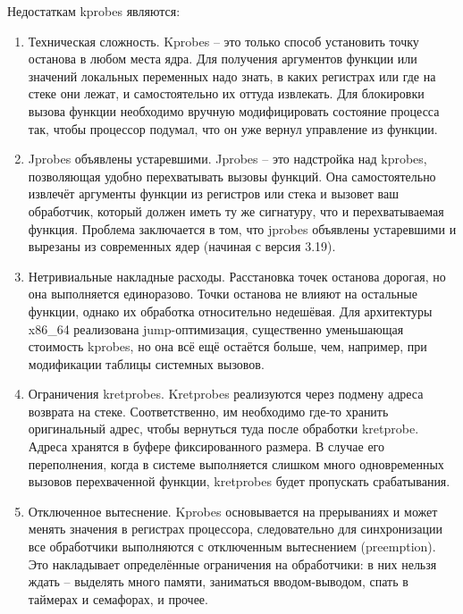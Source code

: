 		Недостаткам kprobes являются:
		\begin{enumerate}
			\item Техническая сложность. 
				Kprobes -- это только способ установить точку останова в любом места ядра. 
				Для получения аргументов функции или значений локальных переменных надо знать,
				в каких регистрах или где на стеке они лежат, и самостоятельно их оттуда извлекать.
				Для блокировки вызова функции необходимо вручную модифицировать состояние процесса так,
				чтобы процессор подумал, что он уже вернул управление из функции.

			\item Jprobes объявлены устаревшими. 
				Jprobes -- это надстройка над kprobes, позволяющая удобно перехватывать вызовы функций.
				Она самостоятельно извлечёт аргументы функции из регистров или стека и вызовет ваш обработчик,
				который должен иметь ту же сигнатуру, что и перехватываемая функция. 
				Проблема заключается в том, что jprobes объявлены устаревшими и вырезаны из современных ядер
				(начиная с версия 3.19).

			\item Нетривиальные накладные расходы. 
				Расстановка точек останова дорогая, но она выполняется единоразово. 
				Точки останова не влияют на остальные функции, однако их обработка относительно недешёвая.
				Для архитектуры x86\_64 реализована jump-оптимизация, существенно уменьшающая стоимость kprobes,
				но она всё ещё остаётся больше, чем, например, при модификации таблицы системных вызовов.

			\item Ограничения kretprobes. 
				Kretprobes реализуются через подмену адреса возврата на стеке. 
				Соответственно, им необходимо где-то хранить оригинальный адрес,
				чтобы вернуться туда после обработки kretprobe. 
				Адреса хранятся в буфере фиксированного размера. 
				В случае его переполнения, когда в системе выполняется слишком много одновременных вызовов перехваченной функции, 
				kretprobes будет пропускать срабатывания.

			\item Отключенное вытеснение. 
				Kprobes основывается на прерываниях и может менять значения в регистрах процессора,
				следовательно для синхронизации все обработчики выполняются с отключенным вытеснением (preemption).
				Это накладывает определённые ограничения на обработчики: 
				в них нельзя ждать -- выделять много памяти, заниматься вводом-выводом, 
				спать в таймерах и семафорах, и прочее.
		\end{enumerate}

